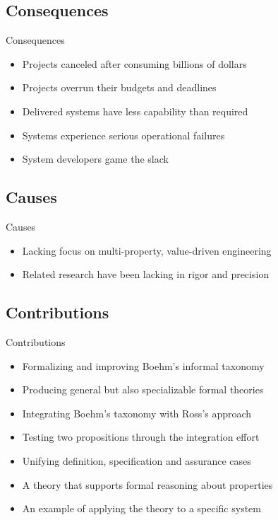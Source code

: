 \documentclass[xcolor=x11names,compress]{beamer}
\renewcommand{\(}{\begin{columns}}
\renewcommand{\)}{\end{columns}}
\newcommand{\<}[1]{\begin{column}{#1}}
\renewcommand{\>}{\end{column}}
\begin{document}
\subsection{Consequences}
\begin{frame}{Consequences}
\begin{itemize}
\item Projects canceled after consuming billions of dollars
\item Projects overrun their budgets and deadlines
\item Delivered systems have less capability than required
\item Systems experience serious operational failures
\item System developers game the slack
\end{itemize}
\end{frame}

\subsection{Causes}
\begin{frame}{Causes}
\begin{itemize}
\item Lacking focus on multi-property, value-driven engineering
\item Related research have been lacking in rigor and precision
\end{itemize}
\end{frame}

\subsection{Contributions}
\begin{frame}{Contributions}
\begin{itemize}
\item Formalizing and improving Boehm's informal taxonomy
\item Producing general but also specializable formal theories
\item Integrating Boehm's taxonomy with Ross's approach
\item Testing two propositions through the integration effort
\item Unifying definition, specification and assurance cases
\item A theory that supports formal reasoning about properties
\item An example of applying the theory to a specific system
\end{itemize}
\end{frame}
\end{document}
